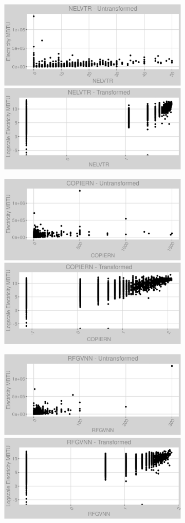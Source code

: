 \FloatBarrier
\newpage
\begin{figure}
\centering
\begin{subfigure}{1\textwidth}
\centering
\includegraphics[width=.49\textwidth, height=0.3\textheight]{Images/electricity_var_original_6.png}
\includegraphics[width=.49\textwidth, height=0.3\textheight]{Images/electricity_var_transformed_6.png}
\end{subfigure}
\begin{subfigure}{1\textwidth}
\centering
\includegraphics[width=.49\textwidth, height=0.3\textheight]{Images/electricity_var_original_7.png}
\includegraphics[width=.49\textwidth, height=0.3\textheight]{Images/electricity_var_transformed_7.png}
\end{subfigure}
\begin{subfigure}{1\textwidth}
\centering
\includegraphics[width=.49\textwidth, height=0.3\textheight]{Images/electricity_var_original_8.png}
\includegraphics[width=.49\textwidth, height=0.3\textheight]{Images/electricity_var_transformed_8.png}
\end{subfigure}
\end{figure}
